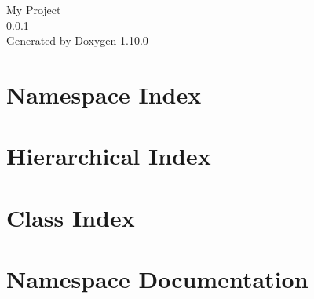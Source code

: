 \documentclass[twoside]{book}
\newcommand{\+}{\discretionary{\mbox{\scriptsize$\hookleftarrow$}}{}{}}
\newcommand{\clearemptydoublepage}{%
    \newpage{\pagestyle{empty}\cleardoublepage}%
  }
\begin{document}
  \raggedbottom
    \hypersetup{pageanchor=false,
                bookmarksnumbered=true,
                pdfencoding=unicode
               }
  \begin{titlepage}
  \vspace*{7cm}
  \begin{center}%
  {\Large My Project}\\
  [1ex]\large 0.\+0.\+1 \\
  \vspace*{1cm}
  {\large Generated by Doxygen 1.10.0}\\
  \end{center}
  \end{titlepage}
  \clearemptydoublepage
  \tableofcontents
  \clearemptydoublepage
  \hypersetup{pageanchor=true}

\chapter{Namespace Index}

\chapter{Hierarchical Index}

\chapter{Class Index}

\chapter{Namespace Documentation}










\end{document}
